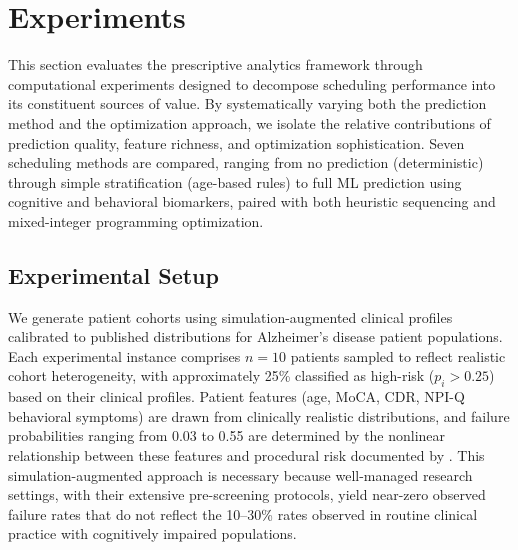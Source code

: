 \documentclass[11pt,a4paper]{article}
\begin{document}


\section{Experiments}
\label{sec:experiments}

This section evaluates the prescriptive analytics framework through computational experiments designed to decompose scheduling performance into its constituent sources of value. By systematically varying both the prediction method and the optimization approach, we isolate the relative contributions of prediction quality, feature richness, and optimization sophistication. Seven scheduling methods are compared, ranging from no prediction (deterministic) through simple stratification (age-based rules) to full ML prediction using cognitive and behavioral biomarkers, paired with both heuristic sequencing and mixed-integer programming optimization.

\subsection{Experimental Setup}
\label{sec:experimental_setup}

We generate patient cohorts using simulation-augmented clinical profiles calibrated to published distributions for Alzheimer's disease patient populations. Each experimental instance comprises $n = 10$ patients sampled to reflect realistic cohort heterogeneity, with approximately 25\% classified as high-risk ($p_i > 0.25$) based on their clinical profiles. Patient features (age, MoCA, CDR, NPI-Q behavioral symptoms) are drawn from clinically realistic distributions, and failure probabilities ranging from 0.03 to 0.55 are determined by the nonlinear relationship between these features and procedural risk documented by \citet{porembka2025disparities}. This simulation-augmented approach is necessary because well-managed research settings, with their extensive pre-screening protocols, yield near-zero observed failure rates that do not reflect the 10--30\% rates observed in routine clinical practice with cognitively impaired populations.
\end{document}
